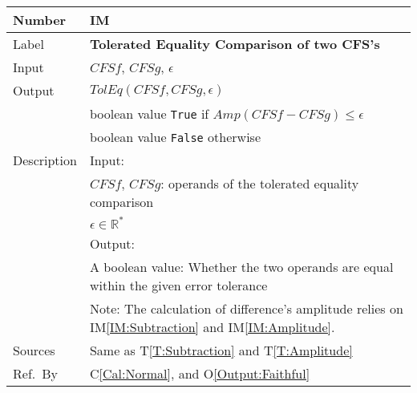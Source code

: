 \documentclass[12pt]{article}
\newcommand{\colAwidth}{0.13\textwidth}
\newcommand{\colBwidth}{0.82\textwidth}
\newcommand{\tref}[1]{T\ref{#1}}
\newcounter{instnum} %
\newcommand{\iref}[1]{IM\ref{#1}}
\newcommand{\calref}[1]{C\ref{#1}}
\newcommand{\oref}[1]{O\ref{#1}}
\begin{document}
\noindent
\begin{minipage}{\textwidth}
	\renewcommand*{\arraystretch}{1.5}
	\begin{tabular}{| p{\colAwidth} | p{\colBwidth}|}
		\hline
		\rowcolor[gray]{0.9}
		Number& IM{instnum}\theinstnum 
		\label{IM:ToleratedEquality}\\
		\hline
		Label& \bf Tolerated Equality Comparison of two CFS's \\
		\hline
		Input& $\mathit{CFSf}$, $\mathit{CFSg}$, $\epsilon$\\
		\hline
		Output&$\mathit{TolEq}(\mathit{CFSf}, \mathit{CFSg}, \epsilon)$\\
		& boolean value \texttt{True} if 
		$\mathit{Amp}(\mathit{CFSf}-\mathit{CFSg})\leq \epsilon$\\
		&boolean value \texttt{False} otherwise\\
		\hline
		Description&Input:\\
		&$\mathit{CFSf}$, $\mathit{CFSg}$: operands of 
		the tolerated equality comparison\\
		&$\epsilon\in\mathbb{R}^{*}$\\
		&Output:\\
		& A boolean value: Whether the two operands are equal 
		within the given error tolerance\\
		&Note: The calculation of difference's amplitude 
		relies on \iref{IM:Subtraction} and \iref{IM:Amplitude}.\\
		\hline
		Sources&Same as \tref{T:Subtraction} and \tref{T:Amplitude}\\
		\hline
		Ref.\ By &  \calref{Cal:Normal}, 
		and \oref{Output:Faithful}\\
		\hline
	\end{tabular}
\end{minipage}\\
~\newline
\end{document}
